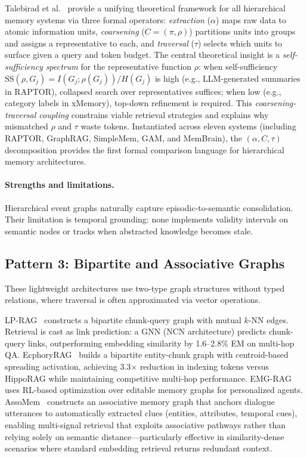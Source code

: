 \documentclass[hf]{ceurart}
\begin{document}
Talebirad et al.~\cite{hiertheory2026} provide a unifying theoretical
framework for all hierarchical memory systems via three formal operators:
\emph{extraction} ($\alpha$) maps raw data to atomic information units,
\emph{coarsening} ($C = (\pi, \rho)$) partitions units into groups and
assigns a representative to each, and \emph{traversal} ($\tau$) selects
which units to surface given a query and token budget. The central
theoretical insight is a \emph{self-sufficiency spectrum} for the
representative function $\rho$: when self-sufficiency
$\text{SS}(\rho, G_j) = I(G_j; \rho(G_j)) / H(G_j)$ is high (e.g.,
LLM-generated summaries in RAPTOR), collapsed search over
representatives suffices; when low (e.g., category labels in xMemory),
top-down refinement is required. This \emph{coarsening-traversal
coupling} constrains viable retrieval strategies and explains why
mismatched $\rho$ and $\tau$ waste tokens. Instantiated across eleven
systems (including RAPTOR, GraphRAG, SimpleMem, GAM, and MemBrain),
the $(\alpha, C, \tau)$ decomposition provides the first formal
comparison language for hierarchical memory architectures.

\paragraph{Strengths and limitations.}
Hierarchical event graphs naturally capture episodic-to-semantic
consolidation. Their limitation is temporal grounding: none implements
validity intervals on semantic nodes or tracks when abstracted knowledge
becomes stale.

\subsection{Pattern 3: Bipartite and Associative Graphs}

These lightweight architectures use two-type graph structures
without typed relations, where traversal is often approximated via
vector operations.

LP-RAG~\cite{lprag2026} constructs a bipartite chunk-query graph
with mutual $k$-NN edges. Retrieval is cast as link prediction:
a GNN (NCN architecture) predicts chunk-query links, outperforming
embedding similarity by 1.6--2.8\% EM on multi-hop QA.
EcphoryRAG~\cite{ecphoryrag2026} builds a bipartite entity-chunk
graph with centroid-based spreading activation, achieving
3.3$\times$ reduction in indexing tokens versus HippoRAG while
maintaining competitive multi-hop performance.
EMG-RAG~\cite{emgrag2024} uses RL-based optimization over editable
memory graphs for personalized agents.
AssoMem~\cite{assomem2025} constructs an associative memory graph
that anchors dialogue utterances to automatically extracted clues
(entities, attributes, temporal cues), enabling multi-signal retrieval
that exploits associative pathways rather than relying solely on
semantic distance---particularly effective in similarity-dense scenarios
where standard embedding retrieval returns redundant context.
\end{document}
